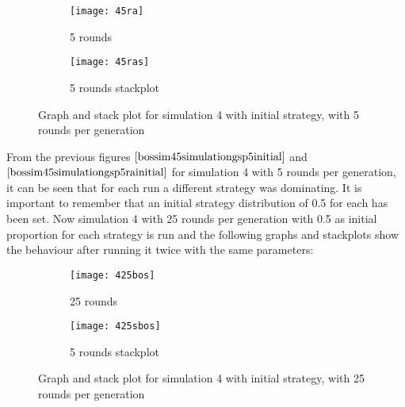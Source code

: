 \begin{figure}[H]       
    \centering
    \begin{subfigure}[b]{0.3\textwidth}
	\centering
	{\texttt{[image: 45ra]}}   
    	\caption{5 rounds}
	\label{fig:bossim45ra}
    \end{subfigure}
    \hfill
    \begin{subfigure}[b]{0.3\textwidth}
	\centering
	{\texttt{[image: 45ras]}}   
    	\caption{5 rounds stackplot}
	\label{fig:bossim45ras}
    \end{subfigure}
    \caption{Graph and stack plot for simulation 4 with initial strategy, with 5 rounds per generation}
    \label{bossim45simulationgsp5rainitial}
\end{figure}

From the previous figures $\ref{bossim45simulationgsp5initial}$ and $\ref{bossim45simulationgsp5rainitial}$ for simulation 4 with 5 rounds per generation, it can be seen that for each run a different strategy was dominating. It is important to remember that an initial strategy distribution of 0.5 for each has been set.
Now simulation 4 with 25 rounds per generation with 0.5 as initial proportion for each strategy is run and the following graphs and stackplots show the behaviour after running it twice with the same parameters:

\begin{figure}[H]       
    \centering
    \begin{subfigure}[b]{0.3\textwidth}
	\centering
	{\texttt{[image: 425bos]}}   
    	\caption{25 rounds}
	\label{fig:bossim425bos}
    \end{subfigure}
    \hfill
    \begin{subfigure}[b]{0.3\textwidth}
	\centering
	{\texttt{[image: 425sbos]}}   
    	\caption{5 rounds stackplot}
	\label{fig:bossim425sbos}
    \end{subfigure}
    \caption{Graph and stack plot for simulation 4 with initial strategy, with 25 rounds per generation}
    \label{bossim425simulationgsp5initial}
\end{figure}

